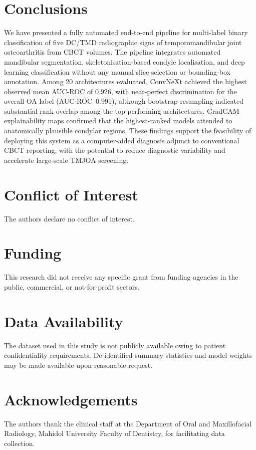 \documentclass[review,12pt]{elsarticle}
\begin{document}
\section{Conclusions}
\label{sec:conc}

We have presented a fully automated end-to-end pipeline for multi-label
binary classification of five DC/TMD radiographic signs of
temporomandibular joint osteoarthritis from CBCT volumes. The pipeline
integrates automated mandibular segmentation, skeletonisation-based
condyle localisation, and deep learning classification without any manual
slice selection or bounding-box annotation. Among 20 architectures
evaluated, ConvNeXt achieved the highest observed mean AUC-ROC of
0.926, with near-perfect discrimination for the overall OA label
(AUC-ROC~0.991), although bootstrap resampling indicated substantial
rank overlap among the top-performing architectures. GradCAM
explainability maps confirmed that the highest-ranked models attended to
anatomically plausible condylar regions. These findings support the
feasibility of deploying this system as a computer-aided diagnosis
adjunct to conventional CBCT reporting, with the potential to reduce
diagnostic variability and accelerate large-scale TMJOA screening.

\section*{Conflict of Interest}
The authors declare no conflict of interest.

\section*{Funding}
This research did not receive any specific grant from funding agencies
in the public, commercial, or not-for-profit sectors.

\section*{Data Availability}
The dataset used in this study is not publicly available owing to
patient confidentiality requirements. De-identified summary statistics
and model weights may be made available upon reasonable request.

\section*{Acknowledgements}
The authors thank the clinical staff at the Department of Oral and
Maxillofacial Radiology, Mahidol University Faculty of Dentistry, for
facilitating data collection.
\end{document}
